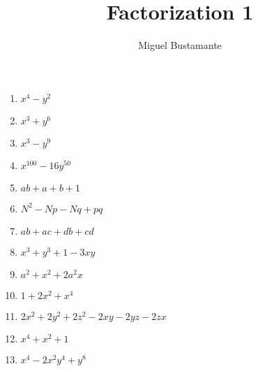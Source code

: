 \documentclass{article}
\title{Factorization 1}
\author{Miguel Bustamante}
\begin{document}
\maketitle
\begin{multicols}{3}
\begin{enumerate}
    \item $x^4-y^2$
    \item $x^3+y^6$
    \item $x^3-y^9$
    \item $x^{100}-16y^{50}$
    \item $ab+a+b+1$
    \item $N^2-Np-Nq+pq$
    \item $ab+ac+db+cd$
    \item $x^3+y^3+1-3xy$
    \item $a^2+x^2+2a^2x$
    \item $1+2x^2+x^4$
    \item $2x^2+2y^2+2z^2-2xy-2yz-2zx$
    \item $x^4+x^2+1$
    \item $x^4-2x^2y^4+y^8$
\end{enumerate}
\end{multicols}
\end{document}

